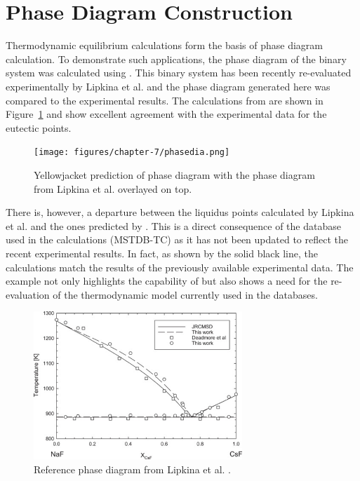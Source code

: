 \section{Phase Diagram Construction}
	Thermodynamic equilibrium calculations form the basis of phase diagram calculation. To demonstrate such applications, the phase diagram of the   binary system was calculated using {\GEM}. This binary system has been recently re-evaluated experimentally by Lipkina et al. \cite{Lipkina:2022aa} and the phase diagram generated here was compared to the experimental results. The calculations from {\GEM} are shown in Figure~\ref{fig:res_phased} and show excellent agreement with the experimental data for the eutectic points.
    \begin{figure}
        \centering
        \texttt{[image: figures/chapter-7/phasedia.png]}
        \caption[Yellowjacket prediction of  phase diagram.]{Yellowjacket prediction of  phase diagram with the phase diagram from Lipkina et al. \cite{Lipkina:2022aa} overlayed on top.}
        \label{fig:res_phased}
    \end{figure}
    There is, however, a departure between the liquidus points calculated by Lipkina et al. and the ones predicted by {\YJ}. This is a direct consequence of the database used in the calculations (MSTDB-TC) as it has not been updated to reflect the recent experimental results. In fact, as shown by the solid black line, the calculations match the results of the previously available experimental data. The example not only highlights the capability of {\GEM} but also shows a need for the re-evaluation of the  thermodynamic model currently used in the databases.
    \begin{figure}
        \centering
        \includegraphics[width=0.7\textwidth]{figures/chapter-7/pdo.png}
        \caption[Reference  phase  diagram from Lipkina et al.]{Reference  phase  diagram from Lipkina et al. \cite{Lipkina:2022aa}.}
        \label{fig:res_refdia}
    \end{figure}

